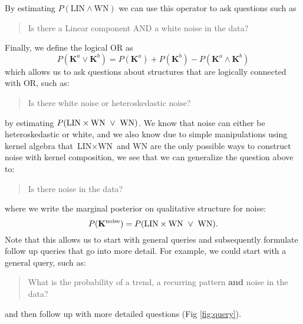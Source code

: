 By estimating $P(\text{LIN} \land \text{WN})$ we can use this operator to ask questions such as 
\begin{quotation}
Is there a Linear component AND a white noise in the data? 
\end{quotation}
Finally, we define the logical OR as
\begin{equation}
P(\mathbf{K}^a \lor \mathbf{K}^b) = P(\mathbf{K}^a) + P(\mathbf{K}^b) - P(\mathbf{K}^a \land \mathbf{K}^b)
\end{equation}
which allows us to ask questions about structures that are logically connected with OR, such as:
\begin{quotation}
Is there white noise or heteroskedastic noise?
\end{quotation}
by estimating $P(\text{LIN} \times \text{WN}\;\;{\large\lor}\;\; \text{WN})$.
We know that noise can either be heteroskedastic or white,
and we also know due to simple manipulations using kernel algebra
that  $\text{LIN} \times \text{WN}$ and $\text{WN}$ are the only possible ways to construct noise with kernel composition, we see that we can generalize the 
question above to:
\begin{quotation}
Is there noise in the data? 
\end{quotation}
where we write the marginal posterior on qualitative structure for noise:
\begin{equation}
P(\mathbf{K}^{\text{noise}}) = P(\text{LIN} \times \text{WN}\;\;{\large\lor}\;\; \text{WN}).
\end{equation}
Note that this allows us to start with general queries and 
subsequently formulate follow up queries that go into more detail.
For example, we could start with a general query, such as:
\begin{quotation}
What is the probability of a trend, a recurring pattern {\bf and} noise in the data?
\end{quotation}
and then follow up with more detailed questions (Fig \ref{fig:query}).
